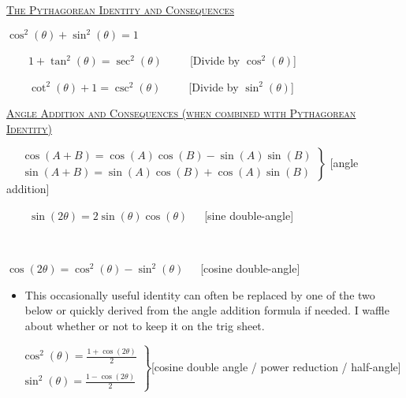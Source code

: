 \documentclass{amsbook}
\numberwithin{section}{chapter}
\numberwithin{equation}{chapter}
\newcommand{\qi}[1]{\begin{itemize}\item #1 \end{itemize}}
\begin{document}
\bigskip
\underline{\textsc{The Pythagorean Identity and Consequences}}

\smallskip
\begin{large}
	$\cos^2(\theta)+ \sin^2(\theta)=1$
\end{large}

\smallskip
\ \ \ \ $1+ \tan^2(\theta)=\sec^2(\theta)$\ \ \ \ \ [Divide by $\cos^2(\theta)$]

\ \ \ \ $\cot^2(\theta)+1 = \csc^2(\theta)$\ \ \ \ \ [Divide by $\sin^2(\theta)$]

\bigskip
\underline{\textsc{Angle Addition and Consequences (when combined with Pythagorean Identity)}}

\smallskip
\begin{large}
	\ \  $
	\left.
	\begin{array}{lr}
	\cos(A+B) = \cos(A)\cos(B)-\sin(A)\sin(B)\\
	\sin(A+B) = \sin(A)\cos(B)+\cos(A)\sin(B)
	\end{array}
	\right \}
	$ [angle addition]
	
	
	
	
	
	\bigskip
	\ \ \ \ $\sin(2\theta) = 2\sin(\theta)\cos(\theta)$\ \ \ [sine double-angle]
	
	\ \ \ \ 	{\small $\cos(2\theta) = \cos^2(\theta) - \sin^2(\theta)$\ \ \ [cosine double-angle] 
 \qi{This occasionally useful identity can often be replaced by one of the two below or quickly derived from the angle addition formula if needed. I waffle about whether or not to keep it on the trig sheet.}}
	
	\bigskip
	\ \  $
	\left.
	\begin{array}{lr}
	\cos^2(\theta) = \displaystyle\frac{1+\cos(2\theta)}{2}\\
	
	\\
	\sin^2(\theta) = \displaystyle\frac{1-\cos(2\theta)}{2}
	\end{array}
	\right \}
	${\small [cosine double angle / power reduction / half-angle]}
	
\end{large} 
\end{document}
